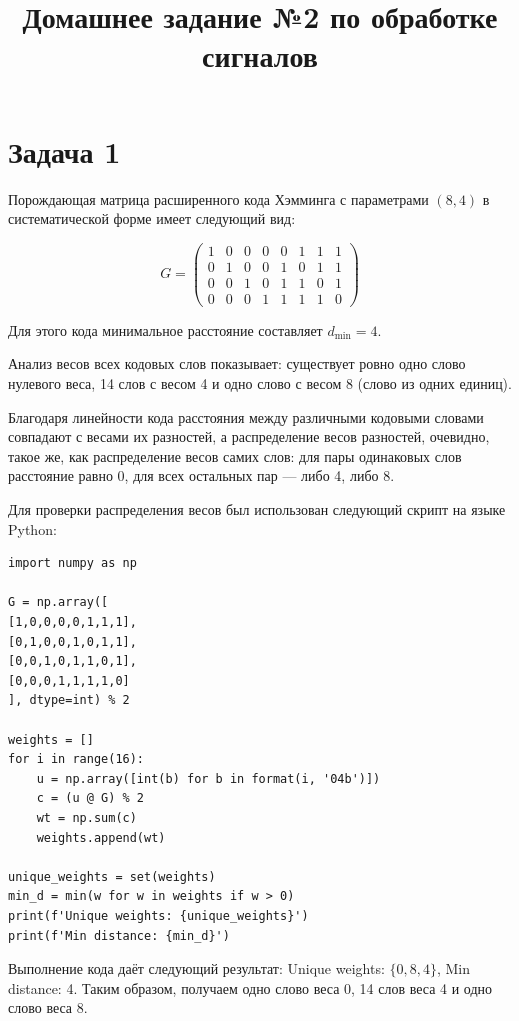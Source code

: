 \documentclass{article}
\begin{document}
\title{Домашнее задание №2 по обработке сигналов}
\author{}
\date{}
\maketitle

\section{Задача 1}

Порождающая матрица расширенного кода Хэмминга с параметрами $(8,4)$ в систематической форме имеет следующий вид:

\[
G = \begin{pmatrix}
1 & 0 & 0 & 0 & 0 & 1 & 1 & 1 \\
0 & 1 & 0 & 0 & 1 & 0 & 1 & 1 \\
0 & 0 & 1 & 0 & 1 & 1 & 0 & 1 \\
0 & 0 & 0 & 1 & 1 & 1 & 1 & 0
\end{pmatrix}
\]

Для этого кода минимальное расстояние составляет $d_{\min} = 4$.

Анализ весов всех кодовых слов показывает: существует ровно одно слово нулевого веса, 14 слов с весом 4 и одно слово с весом 8 (слово из одних единиц).

Благодаря линейности кода расстояния между различными кодовыми словами совпадают с весами их разностей, а распределение весов разностей, очевидно, такое же, как распределение весов самих слов: для пары одинаковых слов расстояние равно 0, для всех остальных пар — либо 4, либо 8.

Для проверки распределения весов был использован следующий скрипт на языке Python:

\begin{verbatim}
import numpy as np

G = np.array([
[1,0,0,0,0,1,1,1],
[0,1,0,0,1,0,1,1],
[0,0,1,0,1,1,0,1],
[0,0,0,1,1,1,1,0]
], dtype=int) % 2

weights = []
for i in range(16):
    u = np.array([int(b) for b in format(i, '04b')])
    c = (u @ G) % 2
    wt = np.sum(c)
    weights.append(wt)

unique_weights = set(weights)
min_d = min(w for w in weights if w > 0)
print(f'Unique weights: {unique_weights}')
print(f'Min distance: {min_d}')
\end{verbatim}

Выполнение кода даёт следующий результат: Unique weights: $\{0, 8, 4\}$, Min distance: 4. Таким образом, получаем одно слово веса 0, 14 слов веса 4 и одно слово веса 8.
\end{document}
